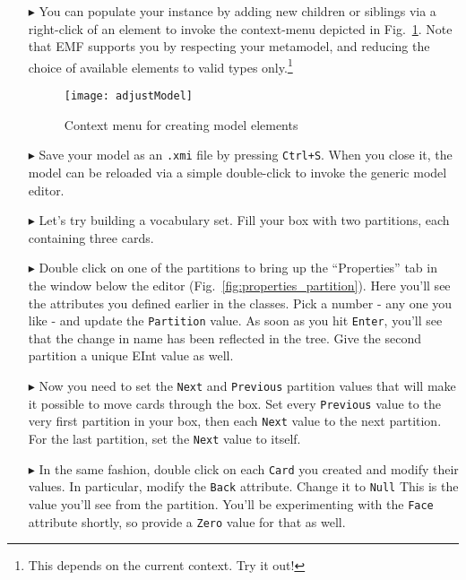 \begin{itemize}
\clearpage

\item[$\blacktriangleright$] You can populate your instance by adding new children or siblings via a right-click of an element to invoke the
context-menu depicted in Fig.~\ref{fig:create_instance}. Note that EMF supports you by respecting your metamodel, and reducing the choice of available elements
to valid types only.\footnote{This depends on the current context. Try it out!}

\begin{figure}[htbp]
	\centering
  \texttt{[image: adjustModel]}
	\caption{Context menu for creating model elements}
	\label{fig:create_instance}
\end{figure}

\item[$\blacktriangleright$] Save your model as an \texttt{.xmi} file by pressing \texttt{Ctrl+S}. When you close it, the model can be reloaded via a simple
double-click to invoke the generic model editor.

\item[$\blacktriangleright$] Let's try building a vocabulary set. Fill your box with two partitions, each containing three cards.

\item[$\blacktriangleright$] Double click on one of the partitions to bring up the ``Properties'' tab in the window below the editor
(Fig.~\ref{fig:properties_partition}). Here you'll see the attributes you defined earlier in the classes. Pick a number - any one you like - and update the
\texttt{Partition} value. As soon as you hit \texttt{Enter}, you'll see that the change in name has been reflected in the tree. Give the second partition a
unique EInt value as well.

\item[$\blacktriangleright$] Now you need to set the \texttt{Next} and \texttt{Previous} partition values that will make it possible to move cards through the
box. Set every \texttt{Previous} value to the very first partition in your box, then each \texttt{Next} value to the next partition. For the last partition, set
the \texttt{Next} value to itself. 

\item[$\blacktriangleright$] In the same fashion, double click on each \texttt{Card} you created and modify their values. In particular, modify the
\texttt{Back} attribute. Change it to \texttt{Null} This is the value you'll see from the partition. You'll be experimenting with the \texttt{Face} attribute
shortly, so provide a \texttt{Zero} value for that as well.


\end{itemize}
